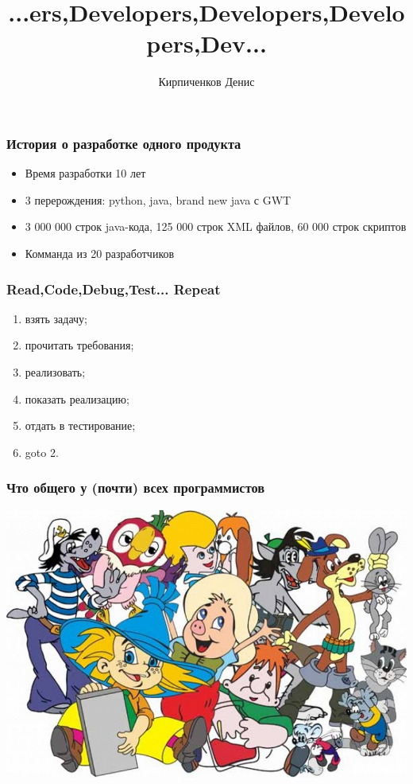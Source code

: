 \documentclass[10pt,pdf,hyperref={unicode}]{beamer}
\date{}
\title[]{...ers,Developers,Developers,Developers,Dev...}
\author[]{Кирпиченков Денис}
\institute[]{Naumen}
\begin{document}
\begin{frame}
\titlepage
\end{frame} 

\begin{frame}
\frametitle{История о разработке одного продукта} 

\begin{itemize}
\item Время разработки 10 лет
\item 3 перерождения: python, java, brand new java с GWT
\item 3 000 000 строк java-кода, 125 000 строк XML файлов,  60 000 строк скриптов
\item Комманда из 20 разработчиков
\end{itemize}

\end{frame}

\begin{frame}
\frametitle{Read,Code,Debug,Test... Repeat} 

\begin{enumerate}

	\item взять задачу;
	\item прочитать требования;
	\item реализовать;
	\item показать реализацию;
	\item отдать в тестирование;
	\item goto 2.
	
\end{enumerate}

\end{frame}

\begin{frame}
\frametitle{Что общего у (почти) всех программистов} 

\center
\includegraphics[height=0.6\textheight]{./multi_fun.png}

\end{frame}
\end{document}
